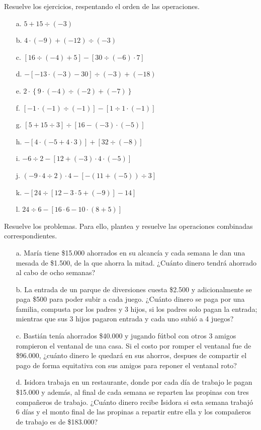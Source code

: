 \documentclass[spanish,letterpaper, 11pt, addpoints, answers]{exam}
\begin{document}
\begin{questions}
    \question Resuelve los ejercicios, respentando el orden de las operaciones.
    \begin{multicols}{2}
      \begin{itemize}
        \item[a.] $5+15\div (-3)$
        \item[b.] $4\cdot (-9)+(-12)\div (-3)$
        \item[c.] $[16\div (-4)+5]-[30\div (-6)\cdot 7]$
        \item[d.] $-[-13\cdot (-3)-30]\div (-3)+(-18)$ 
        \item[e.] $2\cdot \left\{ 9\cdot (-4)\div (-2)+(-7)\right\}$
        \item[f.] $[-1\cdot (-1)\div (-1)]-[1\div 1\cdot (-1)]$
        \item[g.] $[5+15\div 3]\div [16-(-3)\cdot (-5)]$
        \item[h.] $-[4\cdot (-5+4\cdot 3)]+[32\div (-8)]$
        \item[i.] $-6\div 2-[12+(-3)\cdot 4\cdot (-5)]$
        \item[j.] $(-9\cdot 4\div 2)\cdot 4-[-(11+(-5))\div 3]$
        \item[k.] $-[24\div [12-3\cdot 5+(-9)]-14]$
        \item[l.] $24\div 6-[16\cdot 6-10\cdot (8+5)]$   
      \end{itemize}
      
    \end{multicols}
  
    \question Resuelve los problemas. Para ello, plantea y resuelve las operaciones combinadas correspondientes.

    \begin{itemize}
      \item[a.] María tiene \$15.000 ahorrados en su alcancía y cada semana le dan una mesada de \$1.500, de la que ahorra la mitad. ¿Cuánto dinero tendrá ahorrado al cabo de ocho semanas?
      \item[b.] La entrada de un parque de diversiones cuesta \$2.500 y adicionalmente se paga \$500 para poder subir a cada juego. ¿Cuánto dinero se paga por una familia, compusta por los padres y 3 hijos, si los padres solo pagan la entrada; mientras que sus 3 hijos pagaron entrada y cada uno subió a 4 juegos?
      \item[c.] Bastián tenía ahorrados \$40.000 y jugando fútbol con otros 3 amigos rompieron el ventanal de una casa. Si el costo por romper el ventanal fue de \$96.000, ¿cuánto dinero le quedará en sus ahorros, despues de compartir el pago de forma equitativa con sus amigos para reponer el ventanal roto?
      \item[d.] Isidora trabaja en un restaurante, donde por cada día de trabajo le pagan \$15.000 y además, al final de cada semana se reparten las propinas con tres compañeros de trabajo. ¿Cuánto dinero recibe Isidora si esta semana trabajó 6 días y el monto final de las propinas a repartir entre ella y los compañeros de trabajo es de \$183.000?
    \end{itemize}
\end{questions}
\end{document}
